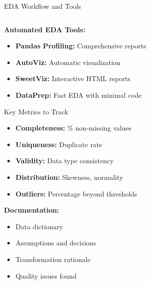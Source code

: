 \documentclass[8pt,aspectratio=1610]{beamer}
\begin{document}
\begin{frame}{EDA Workflow and Tools}
\begin{columns}[t]
\begin{column}{0.48\textwidth}
\textbf{Automated EDA Tools:}
\begin{itemize}
\setlength{\itemsep}{1pt}
\item \textbf{Pandas Profiling:} Comprehensive reports
\item \textbf{AutoViz:} Automatic visualization
\item \textbf{SweetViz:} Interactive HTML reports
\item \textbf{DataPrep:} Fast EDA with minimal code
\end{itemize}

\vspace{0.3cm}
\begin{block}{Key Metrics to Track}
\begin{itemize}
\setlength{\itemsep}{1pt}
\item \textbf{Completeness:} \% non-missing values
\item \textbf{Uniqueness:} Duplicate rate
\item \textbf{Validity:} Data type consistency
\item \textbf{Distribution:} Skewness, normality
\item \textbf{Outliers:} Percentage beyond thresholds
\end{itemize}
\end{block}

\textbf{Documentation:}
\begin{itemize}
\setlength{\itemsep}{1pt}
\item Data dictionary
\item Assumptions and decisions
\item Transformation rationale
\item Quality issues found
\end{itemize}
\end{column}
\end{columns}
\end{frame}
\end{document}
